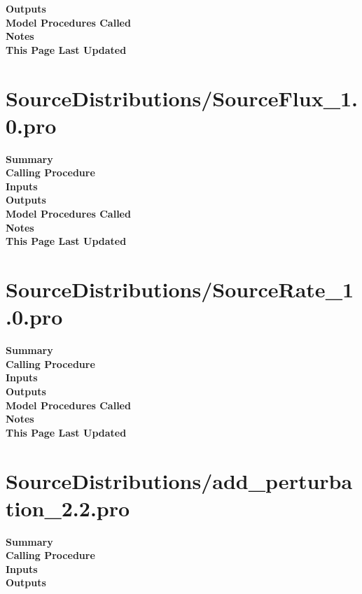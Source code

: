 \documentclass[11pt]{article}
\newcommand\descrip[1]{\textsf{\textbf{\large{#1}}}\\}
\begin{document}
\descrip{Outputs}

\descrip{Model Procedures Called}

\descrip{Notes}

\descrip{This Page Last Updated}

\clearpage

\section{SourceDistributions/SourceFlux\_1.0.pro} \label{sec:sourceflux}

\descrip{Summary}

\descrip{Calling Procedure}

\descrip{Inputs}

\descrip{Outputs}

\descrip{Model Procedures Called}

\descrip{Notes}

\descrip{This Page Last Updated}

\clearpage

\section{SourceDistributions/SourceRate\_1.0.pro} \label{sec:sourcerate}

\descrip{Summary}

\descrip{Calling Procedure}

\descrip{Inputs}

\descrip{Outputs}

\descrip{Model Procedures Called}

\descrip{Notes}

\descrip{This Page Last Updated}

\clearpage

\section{SourceDistributions/add\_perturbation\_2.2.pro}
\label{sec:addperturbation}

\descrip{Summary}

\descrip{Calling Procedure}

\descrip{Inputs}

\descrip{Outputs}
\end{document}
